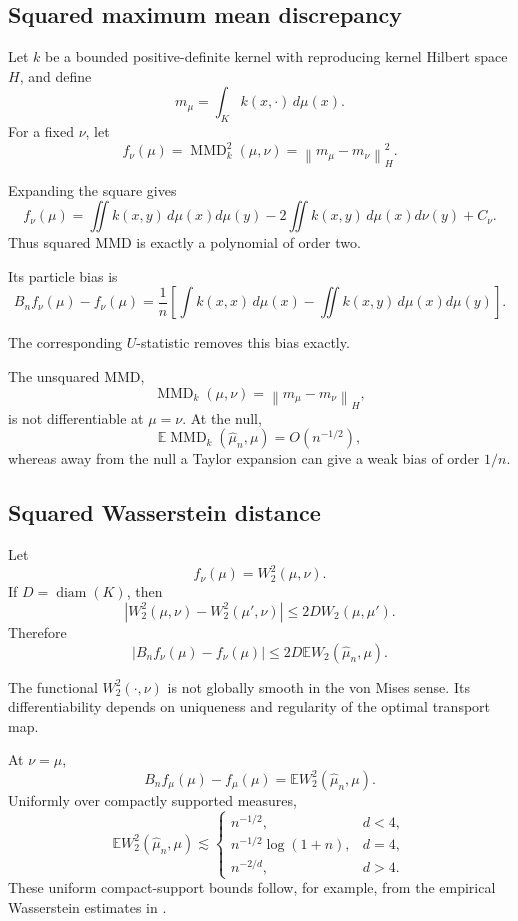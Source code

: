 \documentclass[11pt]{article}
\newcommand{\E}{\mathbb E}
\newcommand{\norm}[1]{\left\lVert #1\right\rVert}
\begin{document}
\subsection{Squared maximum mean discrepancy}

Let \(k\) be a bounded positive-definite kernel with reproducing kernel
Hilbert space \(H\), and define
\[
m_\mu=\int_K k(x,\cdot)\,d\mu(x).
\]
For a fixed \(\nu\), let
\[
f_\nu(\mu)
=
\operatorname{MMD}_k^2(\mu,\nu)
=
\norm{m_\mu-m_\nu}_H^2.
\]

Expanding the square gives
\[
f_\nu(\mu)
=
\iint k(x,y)\,d\mu(x)d\mu(y)
-
2\iint k(x,y)\,d\mu(x)d\nu(y)
+
C_\nu.
\]
Thus squared MMD is exactly a polynomial of order two.

Its particle bias is
\[
B_nf_\nu(\mu)-f_\nu(\mu)
=
\frac1n
\left[
\int k(x,x)\,d\mu(x)
-
\iint k(x,y)\,d\mu(x)d\mu(y)
\right].
\]

The corresponding \(U\)-statistic removes this bias exactly.

The unsquared MMD,
\[
\operatorname{MMD}_k(\mu,\nu)
=
\norm{m_\mu-m_\nu}_H,
\]
is not differentiable at \(\mu=\nu\). At the null,
\[
\E\operatorname{MMD}_k(\widehat\mu_n,\mu)
=
O(n^{-1/2}),
\]
whereas away from the null a Taylor expansion can give a weak bias of
order \(1/n\).

\subsection{Squared Wasserstein distance}

Let
\[
f_\nu(\mu)=W_2^2(\mu,\nu).
\]
If \(D=\operatorname{diam}(K)\), then
\[
\left|
W_2^2(\mu,\nu)-W_2^2(\mu',\nu)
\right|
\leq
2D W_2(\mu,\mu').
\]
Therefore
\[
|B_nf_\nu(\mu)-f_\nu(\mu)|
\leq
2D\E W_2(\widehat\mu_n,\mu).
\]

The functional \(W_2^2(\cdot,\nu)\) is not globally smooth in the
von Mises sense. Its differentiability depends on uniqueness and
regularity of the optimal transport map.

At \(\nu=\mu\),
\[
B_nf_\mu(\mu)-f_\mu(\mu)
=
\E W_2^2(\widehat\mu_n,\mu).
\]
Uniformly over compactly supported measures,
\[
\E W_2^2(\widehat\mu_n,\mu)
\lesssim
\begin{cases}
n^{-1/2},&d<4,\\[1mm]
n^{-1/2}\log(1+n),&d=4,\\[1mm]
n^{-2/d},&d>4.
\end{cases}
\]
These uniform compact-support bounds follow, for example, from the
empirical Wasserstein estimates in
\cite{dereich-scheutzow-schottstedt,fournier-guillin}.
\end{document}
